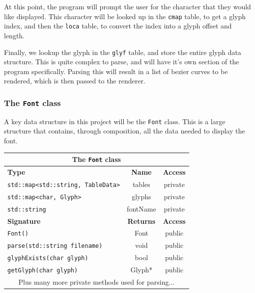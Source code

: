 \documentclass{report}
\begin{document}
At this point, the program will prompt the user for the character that they
would like displayed. This character will be looked up in the \texttt{cmap}
table, to get a glyph index, and then the \texttt{loca} table, to convert the
index into a glyph offset and length.

Finally, we lookup the glyph in the \texttt{glyf} table, and store the entire
glyph data structure. This is quite complex to parse, and will have it's own
section of the program specifically. Parsing this will result in a list of
bezier curves to be rendered, which is then passed to the renderer.

\subsubsection{The \texttt{Font} class}
A key data structure in this project will be the \texttt{Font} class. This is a
large structure that contains, through composition, all the data needed to
display the font.

\begin{center}
  \begin{tabular}{|l|c|c|}
    \hline
    \multicolumn{3}{|c|}{The \texttt{Font} class} \\
    \hline
    \textbf{Type} & \textbf{Name} & \textbf{Access} \\
    \hline
    \texttt{std::map<std::string, TableData>} & tables & private \\
    \hline
    \texttt{std::map<char, Glyph>} & glyphs & private \\
    \hline
    \texttt{std::string} & fontName & private \\
    \hline
    \hline
    \textbf{Signature} & \textbf{Returns} & \textbf{Access} \\
    \hline
    \texttt{Font()} & Font & public \\
    \hline
    \texttt{parse(std::string filename)} & void & public \\
    \hline
    \texttt{glyphExists(char glyph)} & bool & public \\
    \hline
    \texttt{getGlyph(char glyph)} & Glyph* & public \\
    \hline
    \multicolumn{3}{|c|}{Plus many more private methods used for parsing...} \\
    \hline
  \end{tabular}
\end{center}
\end{document}
